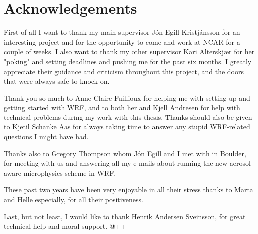 \section*{Acknowledgements}

First of all I want to thank my main supervisor Jón Egill Kristjánsson for an interesting project and for the opportunity to come and work at NCAR for a couple of weeks. I also want to thank my other supervisor Kari Alterskjær for her "poking" and setting deadlines and pushing me for the past six months. I greatly appreciate their guidance and criticism throughout this project, and the doors that were always safe to knock on. 

Thank you so much to Anne Claire Fuillioux for helping me with setting up and getting started with WRF, and to both her and Kjell Andresen for help with technical problems during my work with this thesis. Thanks should also be given to Kjetil Schanke Aas for always taking time to answer any stupid WRF-related questions I might have had.

Thanks also to Gregory Thompson whom Jón Egill and I met with in Boulder, for meeting with us and answering all my e-mails about running the new aerosol-aware microphysics scheme in WRF.

These past two years have been very enjoyable in all their stress thanks to Marta and Helle especially, for all their positiveness.

Last, but not least, I would like to thank Henrik Andersen Sveinsson, for great technical help and moral support. @++

